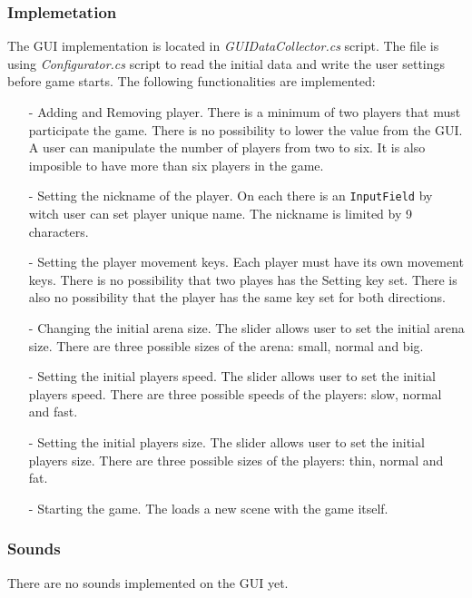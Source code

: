\subsubsection{Implemetation}\label{gui-implementation}
\indent The GUI implementation is located in \textit{GUIDataCollector.cs} script. The file is using \textit{Configurator.cs} script to read the initial data and write the user settings before game starts. The following functionalities are implemented:
\begin{itemize}
	\item[-] Adding and Removing player. There is a minimum of two players that must participate the game. There is no possibility  to lower the value from the GUI. A user can manipulate the number of players from two to six. It is also imposible to have more than six players in the game.
	\item[-] Setting the nickname of the player. On each  there is an \verb+InputField+ by witch user can set player unique name. The nickname is limited by 9 characters.
	\item[-] Setting the player movement keys. Each player must have its own movement keys. There is no possibility that two playes has the Setting key set. There is also no possibility that the player has the same key set for both directions.
	\item[-] Changing the initial arena size. The  slider allows user to set the initial arena size. There are three possible sizes of the arena: small, normal and big.
	\item[-] Setting the initial players speed. The  slider allows user to set the initial players speed. There are three possible speeds of the players: slow, normal and fast.
	\item[-] Setting the initial players size. The  slider allows user to set the initial players size. There are three possible sizes of the players: thin, normal and fat.
	\item[-] Starting the game. The  loads a new scene with the game itself.
\end{itemize} 

\subsubsection{Sounds}
\indent There are no sounds implemented on the GUI yet.